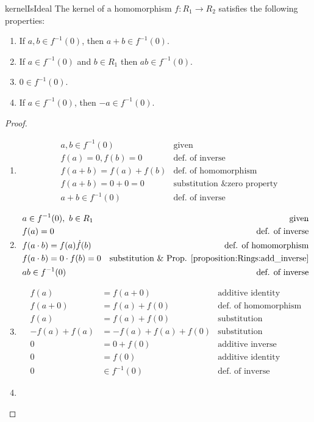 \begin{prop}{kernelIsIdeal}
The kernel of a homomorphism $f:R_1\rightarrow R_2$ satisfies the following properties:
\begin{enumerate}
\item If $a,b\in f^{-1}(0)$, then $a+b\in f^{-1}(0)$.
\item If $a\in f^{-1}(0)$ and $b\in R_1$ then $ab\in f^{-1}(0)$.
\item $0\in f^{-1}(0)$.
\item If $a\in f^{-1}(0)$, then $-a\in f^{-1}(0)$.
\end{enumerate}

\begin{proof}
\begin{enumerate}
\item
\begin{align*}
&a,b\in f^{-1}(0) & \text{given}\\
&f(a)=0,f(b)=0 & \text{def. of inverse}\\
&f(a+b)=f(a)+f(b) & \text{def. of homomorphism}\\
&f(a+b)=0+0=0 & \text{substitution \& zero property}\\
&a+b\in f^{-1}(0) & \text{def. of inverse}
\end{align*}
\item
\begin{align*}
&a\in f^{-1}(0),~b\in R_1 & \text{given}\\
&f(a)=0 & \text{def. of inverse}\\
&f(a\cdot b)=f(a)\dot f(b) & \text{def. of homomorphism}\\
&f(a\cdot b)=0\cdot f(b)=0 & \text{substitution \& Prop. \ref{proposition:Rings:add_inverse}}\\
&ab\in f^{-1}(0) & \text{def. of inverse}
\end{align*}
\item
\begin{align*}
f(a)&=f(a+0) & \text{additive identity}\\
f(a+0)&=f(a)+f(0) & \text{def. of homomorphism}\\
f(a)&=f(a)+f(0) & \text{substitution}\\
-f(a)+f(a)&=-f(a)+f(a)+f(0) & \text{substitution}\\
0&=0+f(0) & \text{additive inverse}\\
0&=f(0) & \text{additive identity}\\
0&\in f^{-1}(0) & \text{def. of inverse}
\end{align*}
\item

\end{enumerate}
\end{proof}
\end{prop}
